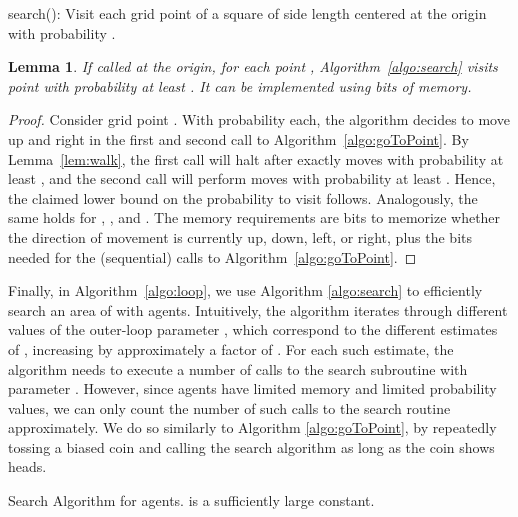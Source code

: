 \documentclass[11pt]{article}
\newtheorem{lemma}[theorem]{Lemma}
\begin{document}
 \begin{algorithm}
\caption{search(): Visit each grid point of a square of side length  centered at the origin with probability .}
\label{algo:search}
\end{algorithm}

\begin{lemma}
\label{lem:uniformArea}
  If called at the origin, for each point , Algorithm~\ref{algo:search} visits point  with probability at least . It can be implemented using  bits of memory.
\end{lemma}
\begin{proof}
	Consider grid point . With probability  each, the algorithm decides to move up and right in the first and second call to Algorithm~\ref{algo:goToPoint}. By Lemma~\ref{lem:walk}, the first call will halt after exactly  moves with probability at least , and the second call will perform  moves with probability at least . Hence, the claimed lower bound on the probability to visit  follows. Analogously, the same holds for , , and . The memory requirements are  bits to memorize whether the direction of movement is currently up, down, left, or right, plus the  bits needed for the (sequential) calls to Algorithm~\ref{algo:goToPoint}.
\end{proof}


Finally, in Algorithm~\ref{algo:loop}, we use Algorithm \ref{algo:search} to efficiently search an area of  with  agents. Intuitively, the algorithm iterates through different values of the outer-loop parameter , which correspond to the different estimates of , increasing by approximately a factor of . For each such estimate, the algorithm needs to execute a number of calls to the search subroutine with parameter . 
However, since agents have limited memory and limited probability values, we can only count the number of such calls to the search routine approximately. We do so similarly to Algorithm \ref{algo:goToPoint}, by repeatedly tossing a biased coin and calling the search algorithm as long as the coin shows heads. 

\begin{algorithm}
\caption{Search Algorithm for  agents.  is a sufficiently large constant.}
\label{algo:loop}
\end{algorithm}
\end{document}
